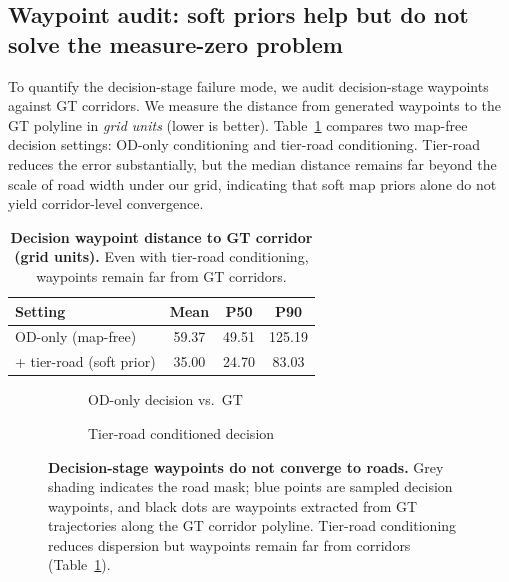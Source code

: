 \subsection{Waypoint audit: soft priors help but do not solve the measure-zero problem}
\label{sec:results-waypoint-audit}

To quantify the decision-stage failure mode, we audit decision-stage waypoints against GT corridors.
We measure the distance from generated waypoints to the GT polyline in \emph{grid units} (lower is better).
Table~\ref{tab:wp-audit} compares two map-free decision settings: OD-only conditioning and tier-road conditioning.
Tier-road reduces the error substantially, but the median distance remains far beyond the scale of road width under our grid, indicating that soft map priors alone do not yield corridor-level convergence.

\begin{table}[t]
  \centering
  \caption{\textbf{Decision waypoint distance to GT corridor (grid units).}
  Even with tier-road conditioning, waypoints remain far from GT corridors.}
  \label{tab:wp-audit}
  \begin{tabular}{lccc}
    \toprule
    Setting & Mean & P50 & P90 \\
    \midrule
    OD-only (map-free) & 59.37 & 49.51 & 125.19 \\
    + tier-road (soft prior) & 35.00 & 24.70 & 83.03 \\
    \bottomrule
  \end{tabular}
\end{table}

\begin{figure}[t]
  \centering
  \begin{subfigure}[t]{0.49\linewidth}
    \centering
    \caption{OD-only decision vs.\ GT}
  \end{subfigure}
  \hfill
  \begin{subfigure}[t]{0.49\linewidth}
    \centering
    \caption{Tier-road conditioned decision}
  \end{subfigure}
  \caption{\textbf{Decision-stage waypoints do not converge to roads.}
  Grey shading indicates the road mask; blue points are sampled decision waypoints, and black dots are waypoints extracted from GT trajectories along the GT corridor polyline. Tier-road conditioning reduces dispersion but waypoints remain far from corridors (Table~\ref{tab:wp-audit}).}
  \label{fig:waypoint-audit}
\end{figure}

